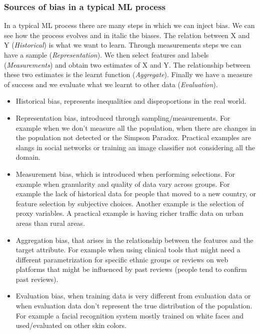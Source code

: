 \subsubsection{Sources of bias in a typical ML process}
In a typical ML process there are many steps in which we can inject bias. We can see how the process evolves and in italic the biases.
The relation between X and Y (\textit{Historical}) is what we want to learn. Through measurements steps we can have a sample (\textit{Representation}). We then select features and labels (\textit{Measurements}) and obtain two estimates of X and Y. The relationship between these two estimates is the learnt function (\textit{Aggregate}). Finally we have a measure of success and we evaluate what we learnt to other data (\textit{Evaluation}).
\begin{itemize}
    \item Historical bias, represents inequalities and disproportions in the real world.
    \item Representation bias, introduced through sampling/measurements. For example when we don't measure all the population, when there are changes in the population not detected or the Simpson Paradox. Practical examples are slangs in social networks or training an image classifier not considering all the domain.
    \item Measurement bias, which is introduced when performing selections. For example when granularity and quality of data vary across groups. For example the lack of historical data for people that moved to a new country, or feature selection by subjective choices. Another example is the selection of proxy variables. A practical example is having richer traffic data on urban areas than rural areas.
    \item Aggregation bias, that arises in the relationship between the features and the target attribute. For example when using clinical tools that might need a different parametrization for specific ethnic groups or reviews on web platforms that might be influenced by past reviews (people tend to confirm past reviews).
    \item Evaluation bias, when training data is very different from evaluation data or when evaluation data don't represent the true distribution of the population. For example a facial recognition system mostly trained on white faces and used/evaluated on other skin colors.
\end{itemize}
